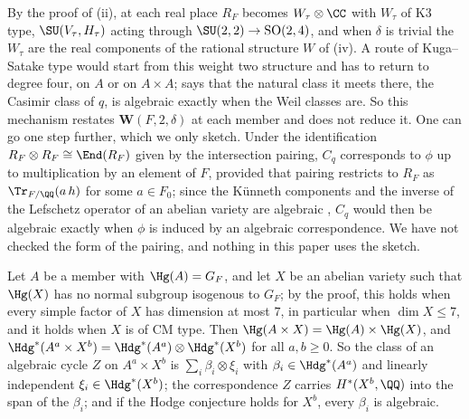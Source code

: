 \begin{remark}\label{rem:quarticisogeny}
By the proof of (ii), at each real place $R_{F}$ becomes
$W_{\tau}\otimes\CC$ with $W_{\tau}$ of K3 type, $\SU(V_{\tau},H_{\tau})$ acting
through $\SU(2,2)\to\mathrm{SO}(2,4)$, and when $\delta$ is trivial the
$W_{\tau}$ are the real components of the rational structure $W$ of
(iv). A route of Kuga--Satake type would start from
this weight two structure and has to return to degree four, on $A$ or on
$A\times A$;  says that the natural class it meets
there, the Casimir class of $q$, is algebraic exactly when the Weil classes
are. So this mechanism restates $\mathbf{W}(F,2,\delta)$ at each member and
does not reduce it. One can go one step further, which we only sketch. Under
the identification $R_{F}\otimes R_{F}\cong\End(R_{F})$ given by the
intersection pairing, $C_{q}$ corresponds to $\phi$ up to multiplication by an
element of $F$, provided that pairing restricts to $R_{F}$ as
$\Tr_{F/\QQ}(a\,h)$ for some $a\in F_{0}$; since the K\"unneth components and
the inverse of the Lefschetz operator of an abelian variety are algebraic
\cite[\S2]{Kle68}, $C_{q}$ would then be algebraic exactly when $\phi$ is
induced by an algebraic correspondence. We have not checked the form of the
pairing, and nothing in this paper uses the sketch.
\end{remark}

\begin{proposition}
\label{prop:quarticnogo}
Let $A$ be a member with $\Hg(A)=G_{F}$, and let $X$ be an abelian variety
such that $\Hg(X)$ has no normal subgroup isogenous to $G_{F}$; by the proof,
this holds when every simple factor of $X$ has dimension at most $7$, in
particular when $\dim X\le7$, and it holds when $X$ is of CM type. Then
$\Hg(A\times X)=\Hg(A)\times\Hg(X)$, and
$\Hdg^{*}(A^{a}\times X^{b})=\Hdg^{*}(A^{a})\otimes\Hdg^{*}(X^{b})$ for all
$a,b\ge0$. So the class of an algebraic cycle $Z$ on $A^{a}\times X^{b}$ is
$\sum_{i}\beta_{i}\otimes\xi_{i}$ with $\beta_{i}\in\Hdg^{*}(A^{a})$ and
linearly independent $\xi_{i}\in\Hdg^{*}(X^{b})$; the correspondence $Z$
carries $H^{*}(X^{b},\QQ)$ into the span of the $\beta_{i}$; and if the Hodge
conjecture holds for $X^{b}$, every $\beta_{i}$ is algebraic.
\end{proposition}

